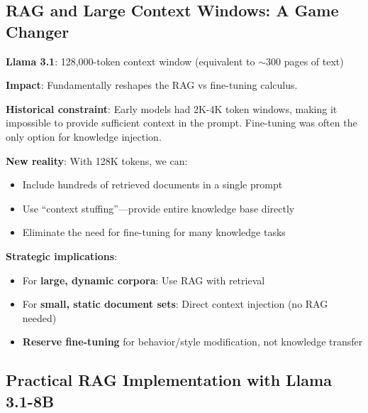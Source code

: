 \documentclass{article}
\begin{document}
\subsection{RAG and Large Context Windows: A Game Changer}

\begin{tcolorbox}[colback=blue!5!white, colframe=blue!75!black, title=The 128K Context Window Revolution]
\textbf{Llama 3.1}: 128,000-token context window (equivalent to $\sim$300 pages of text)

\textbf{Impact}: Fundamentally reshapes the RAG vs fine-tuning calculus.

\textbf{Historical constraint}: Early models had 2K-4K token windows, making it impossible to provide sufficient context in the prompt. Fine-tuning was often the only option for knowledge injection.

\textbf{New reality}: With 128K tokens, we can:
\begin{itemize}
\item Include hundreds of retrieved documents in a single prompt
\item Use ``context stuffing''---provide entire knowledge base directly
\item Eliminate the need for fine-tuning for many knowledge tasks
\end{itemize}
\end{tcolorbox}

\textbf{Strategic implications}:
\begin{itemize}
\item For \textbf{large, dynamic corpora}: Use RAG with retrieval
\item For \textbf{small, static document sets}: Direct context injection (no RAG needed)
\item \textbf{Reserve fine-tuning} for behavior/style modification, not knowledge transfer
\end{itemize}

\subsection{Practical RAG Implementation with Llama 3.1-8B}


\end{document}
